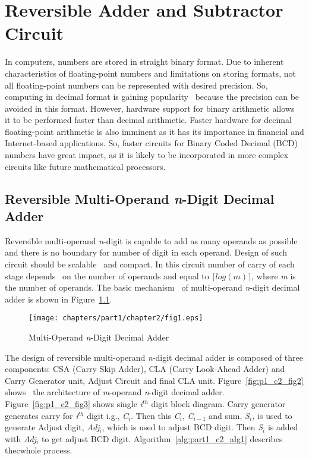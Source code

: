 \chapter{Reversible Adder and Subtractor Circuit}
\label{ch:p3__chapter2}


In computers, numbers are stored in straight binary format. Due to inherent characteristics of floating-point numbers and limitations on storing formats, not all floating-point numbers can be represented with desired precision. So, computing in decimal format is gaining popularity~ because the precision can be avoided in this format. However, hardware support for binary arithmetic allows~ it to be performed faster than decimal arithmetic. Faster hardware for decimal floating-point arithmetic is also imminent as it has its importance in financial and Internet-based applications. So, faster circuits for Binary Coded Decimal (BCD) numbers have great impact, as it is likely to be incorporated in more complex circuits like future mathematical processors.

\section{Reversible Multi-Operand {\it n}-Digit Decimal Adder}

Reversible multi-operand {\it n}-digit is capable to add as many operands as possible and there is no boundary for number of digit in each operand. Design of such circuit should be scalable~ and compact. In this circuit number of carry of each stage depends~ on the number of operands and equal to $\lceil{log(m)}\rceil$, where {\it m} is the number of operands. The basic mechanism~ of multi-operand {\it n}-digit decimal adder is shown in Figure~\ref{fig:p1_c2_fig1}.

\begin{figure}[!tbh]
\centering
\texttt{[image: chapters/part1/chapter2/fig1.eps]}
\caption{Multi-Operand {\it n}-Digit Decimal Adder}
\label{fig:p1_c2_fig1}
\end{figure}

The design of reversible multi-operand {\it n}-digit decimal adder is composed of three components: CSA (Carry Skip Adder), CLA (Carry Look-Ahead Adder) and Carry Generator unit, Adjust Circuit and final CLA unit. Figure~\ref{fig:p1_c2_fig2} shows~ the architecture of {\it m}-operand {\it n}-digit decimal adder. Figure~\ref{fig:p1_c2_fig3} shows single {\it i${}^{th}$} digit block diagram. Carry generator generates carry for {\it i${}^{th}$} digit i.g., {\it C${}_{i}$}. Then this {\it C${}_{i}$}, {\it C${}_{i-1}$} and sum, {\it S${}_{i}$,} is used to generate Adjust digit, {\it Adj${}_{i}$}, which is used to adjust BCD digit. Then {\it S${}_{i}$} is added with {\it Adj${}_{i}$} to get adjust BCD digit. Algorithm~\ref{alg:part1_c2_alg1} describes thecwhole process.


